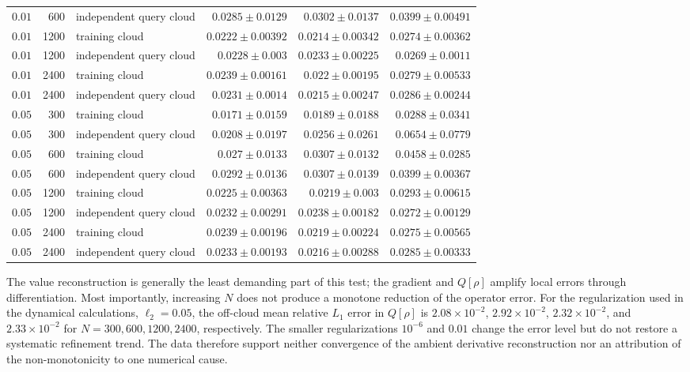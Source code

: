 \documentclass[
  11pt,
  letterpaper,
  onehalfspacing,
  normalmargins,
  equalmargins,
  oneside
]{ut-thesis}
\begin{document}
\begin{longtable}{r r L{0.25\textwidth} r r r}
$0.01$ & 600 & independent query cloud & $0.0285\pm 0.0129$ & $0.0302\pm 0.0137$ & $0.0399\pm 0.00491$ \\
$0.01$ & 1200 & training cloud & $0.0222\pm 0.00392$ & $0.0214\pm 0.00342$ & $0.0274\pm 0.00362$ \\
$0.01$ & 1200 & independent query cloud & $0.0228\pm 0.003$ & $0.0233\pm 0.00225$ & $0.0269\pm 0.0011$ \\
$0.01$ & 2400 & training cloud & $0.0239\pm 0.00161$ & $0.022\pm 0.00195$ & $0.0279\pm 0.00533$ \\
$0.01$ & 2400 & independent query cloud & $0.0231\pm 0.0014$ & $0.0215\pm 0.00247$ & $0.0286\pm 0.00244$ \\
$0.05$ & 300 & training cloud & $0.0171\pm 0.0159$ & $0.0189\pm 0.0188$ & $0.0288\pm 0.0341$ \\
$0.05$ & 300 & independent query cloud & $0.0208\pm 0.0197$ & $0.0256\pm 0.0261$ & $0.0654\pm 0.0779$ \\
$0.05$ & 600 & training cloud & $0.027\pm 0.0133$ & $0.0307\pm 0.0132$ & $0.0458\pm 0.0285$ \\
$0.05$ & 600 & independent query cloud & $0.0292\pm 0.0136$ & $0.0307\pm 0.0139$ & $0.0399\pm 0.00367$ \\
$0.05$ & 1200 & training cloud & $0.0225\pm 0.00363$ & $0.0219\pm 0.003$ & $0.0293\pm 0.00615$ \\
$0.05$ & 1200 & independent query cloud & $0.0232\pm 0.00291$ & $0.0238\pm 0.00182$ & $0.0272\pm 0.00129$ \\
$0.05$ & 2400 & training cloud & $0.0239\pm 0.00196$ & $0.0219\pm 0.00224$ & $0.0275\pm 0.00565$ \\
$0.05$ & 2400 & independent query cloud & $0.0233\pm 0.00193$ & $0.0216\pm 0.00288$ & $0.0285\pm 0.00333$ \\
\end{longtable}
\endgroup

The value reconstruction is generally the least demanding part of this test;
the gradient and \(Q[\rho]\) amplify local errors through differentiation.
Most importantly, increasing \(N\) does not produce a monotone reduction of
the operator error. For the regularization used in the dynamical calculations,
\(\ell_2=0.05\), the off-cloud mean relative \(L_1\) error in \(Q[\rho]\) is
\(2.08\times10^{-2}\), \(2.92\times10^{-2}\),
\(2.32\times10^{-2}\), and \(2.33\times10^{-2}\) for
\(N=300,600,1200,2400\), respectively. The smaller regularizations
\(10^{-6}\) and \(0.01\) change the error level but do not restore a systematic
refinement trend. The data therefore support neither convergence of the
ambient derivative reconstruction nor an attribution of the non-monotonicity
to one numerical cause.
\end{document}
